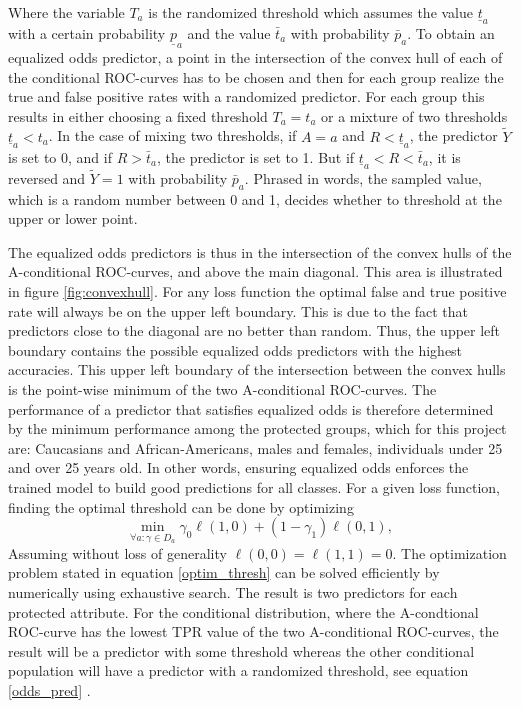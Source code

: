 \documentclass[11pt, fleqn, titlepage]{article}
\begin{document}
	\noindent Where the variable $ T_a $ is the randomized threshold which assumes the value $ \underline{t}_{a} $ with a certain probability $ \underline{p}_a $ and the value $\bar t_{a} $ with probability $ \bar p_a $. To obtain an equalized odds predictor, a point in the intersection of the convex hull of each of the conditional ROC-curves has to be chosen and then for each group realize the true and false positive rates with a randomized predictor. For each group this results in either choosing a fixed threshold $ T_a = t_a $ or a mixture of two thresholds $ \underline t_a < t_a $. In the case of mixing two thresholds, if $ A=a $ and $ R < \underline t_a $, the predictor $ \tilde Y $ is set to 0, and if $ R > \bar t_a $, the predictor is set to 1. But if $ \underline t_a < R < \bar t_a $, it is reversed and $ \tilde Y = 1 $ with probability $ \bar p_a$. Phrased in words, the sampled value, which is a random number between 0 and 1, decides whether to threshold at the upper or lower point.
	
	The equalized odds predictors is thus in the intersection of the convex hulls of the A-conditional ROC-curves, and above the main diagonal. This area is illustrated in figure \ref{fig:convexhull}. For any loss function the optimal false and true positive rate will always be on the upper left boundary. This is due to the fact that predictors close to the diagonal are no better than random. Thus, the upper left boundary contains the possible equalized odds predictors with the highest accuracies. This upper left boundary of the intersection between the convex hulls is the point-wise minimum of the two A-conditional ROC-curves. The performance of a predictor that satisfies equalized odds is therefore determined by the minimum performance among the protected groups, which for this project are: Caucasians and African-Americans, males and females, individuals under 25 and over 25 years old. In other words, ensuring equalized odds enforces the trained model to build good predictions for all classes. For a given loss function, finding the optimal threshold can be done by optimizing
	\begin{equation}\label{optim_thresh}
	\min _{\forall a: \gamma \in D_{a}} \gamma_{0} \ell(1,0)+\left(1-\gamma_{1}\right) \ell(0,1),
	\end{equation}
	Assuming without loss of generality $ \ell (0,0) = \ell(1,1)=0 $.
	The optimization problem stated in equation \ref{optim_thresh} can be solved efficiently by numerically using exhaustive search. The result is two predictors for each protected attribute. For the conditional distribution, where the A-condtional ROC-curve has the lowest TPR value of the two A-conditional ROC-curves, the result will be a predictor with some threshold whereas the other conditional population will have a predictor with a randomized threshold, see equation \ref{odds_pred} \cite{equal_of_oppor}.
\end{document}
